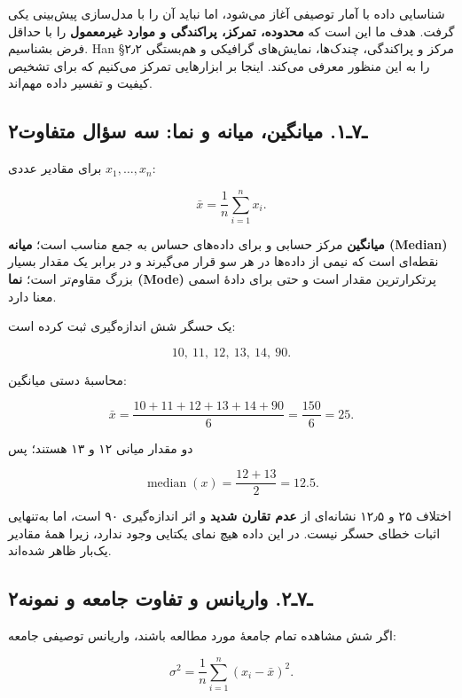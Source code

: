 \documentclass[12pt,a4paper,oneside]{book}
\begin{document}
شناسایی داده با آمار توصیفی آغاز می‌شود، اما نباید آن را با مدل‌سازی پیش‌بینی یکی گرفت. هدف ما این است که \textbf{محدوده، تمرکز، پراکندگی و موارد غیرمعمول} را با حداقل فرض بشناسیم. Han §۲٫۲ مرکز و پراکندگی، چندک‌ها، نمایش‌های گرافیکی و هم‌بستگی را به این منظور معرفی می‌کند. اینجا بر ابزارهایی تمرکز می‌کنیم که برای تشخیص کیفیت و تفسیر داده مهم‌اند.

\subsection{۲ـ۷ـ۱. میانگین، میانه و نما: سه سؤال متفاوت}\label{ux640ux6f7ux640ux6f1.-ux645ux6ccux627ux646ux6afux6ccux646-ux645ux6ccux627ux646ux647-ux648-ux646ux645ux627-ux633ux647-ux633ux624ux627ux644-ux645ux62aux641ux627ux648ux62a}

برای مقادیر عددی \(x_1,\ldots,x_n\):

\[
\bar x=\frac1n\sum_{i=1}^{n}x_i.
\]

\textbf{میانگین} مرکز حسابی و برای داده‌های حساس به جمع مناسب است؛ \textbf{میانه (Median)} نقطه‌ای است که نیمی از داده‌ها در هر سو قرار می‌گیرند و در برابر یک مقدار بسیار بزرگ مقاوم‌تر است؛ \textbf{نما (Mode)} پرتکرارترین مقدار است و حتی برای دادهٔ اسمی معنا دارد.

یک حسگر شش اندازه‌گیری ثبت کرده است:

\[
10,\ 11,\ 12,\ 13,\ 14,\ 90.
\]

محاسبهٔ دستی میانگین:

\[
\bar x=\frac{10+11+12+13+14+90}{6}=\frac{150}{6}=25.
\]

دو مقدار میانی ۱۲ و ۱۳ هستند؛ پس

\[
\operatorname{median}(x)=\frac{12+13}{2}=12.5.
\]

اختلاف ۲۵ و ۱۲٫۵ نشانه‌ای از \textbf{عدم تقارن شدید} و اثر اندازه‌گیری ۹۰ است، اما به‌تنهایی اثبات خطای حسگر نیست. در این داده هیچ نمای یکتایی وجود ندارد، زیرا همهٔ مقادیر یک‌بار ظاهر شده‌اند.

\subsection{۲ـ۷ـ۲. واریانس و تفاوت جامعه و نمونه}\label{ux640ux6f7ux640ux6f2.-ux648ux627ux631ux6ccux627ux646ux633-ux648-ux62aux641ux627ux648ux62a-ux62cux627ux645ux639ux647-ux648-ux646ux645ux648ux646ux647}

اگر شش مشاهده تمام جامعهٔ مورد مطالعه باشند، واریانس توصیفی جامعه:

\[
\sigma^2=\frac1n\sum_{i=1}^{n}(x_i-\bar x)^2.
\]
\end{document}
